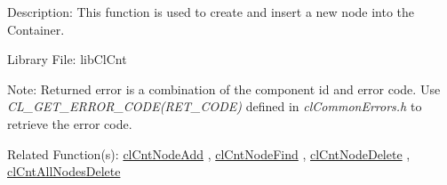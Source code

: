 \begin{Desc}
\item[Description:]This function is used to create and insert a new node into the Container.\end{Desc}
\begin{Desc}
\item[Library File:]lib\-Cl\-Cnt\end{Desc}
\begin{Desc}
\item[Note:]Returned error is a combination of the component id and error code. Use \textit{CL\_\-GET\_\-ERROR\_\-CODE(RET\_\-CODE)} defined in \textit{clCommonErrors.h} to retrieve the error code.\end{Desc}
\begin{Desc}
\item[Related Function(s):]\hyperlink{pagecnt105}{cl\-Cnt\-Node\-Add} , \hyperlink{pagecnt109}{cl\-Cnt\-Node\-Find} , 
\hyperlink{pagecnt108}{cl\-Cnt\-Node\-Delete} , \hyperlink{pagecnt106}{cl\-Cnt\-All\-Nodes\-Delete} \end{Desc}


\newpage
